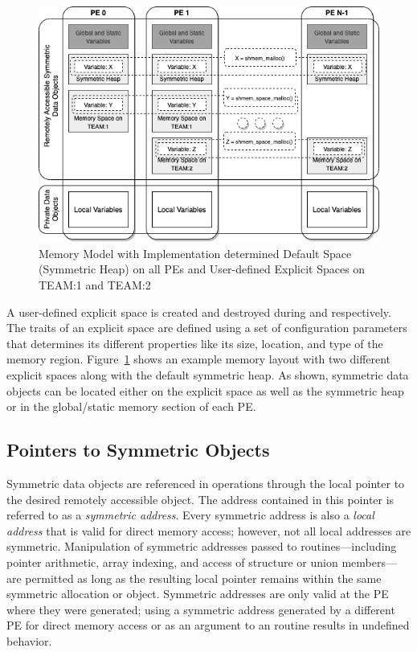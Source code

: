 \begin{figure}[h]
\includegraphics[width=\textwidth]{figures/spaces_mem_model.png}
\caption{\openshmem Memory Model with Implementation determined Default Space
(Symmetric Heap) on all \acp{PE} and User-defined Explicit Spaces on TEAM:1 and
TEAM:2}
\label{fig:spaces_mem_model}
\end{figure}

A user-defined explicit space is created and destroyed during
 and  respectively. The
traits of an explicit space are defined using a set of configuration parameters
that determines its different properties like its size, location, and type of
the memory region. Figure~\ref{fig:spaces_mem_model} shows an example \openshmem
memory layout with two different explicit spaces along with the default
symmetric heap. As shown, symmetric data objects can be located either on the
explicit space as well as the symmetric heap or in the global/static memory
section of each \ac{PE}.

\subsection{Pointers to Symmetric Objects}\label{subsec:pointers_to_symmetric_objects}

Symmetric data objects are referenced in \openshmem operations through the
local pointer to the desired remotely accessible object.  The address contained
in this pointer is referred to as a {\em symmetric address}.  Every symmetric
address is also a {\em local address} that is valid for direct memory access;
however, not all local addresses are symmetric.  Manipulation of symmetric
addresses passed to \openshmem routines---including pointer arithmetic,
array indexing, and access of structure or union members---are permitted as long as
the resulting local pointer remains within the same symmetric allocation or
object.  Symmetric addresses are only valid at the \ac{PE} where they were
generated; using a symmetric address generated by a different \ac{PE} for
direct memory access or as an argument to an \openshmem routine results
in undefined behavior.

